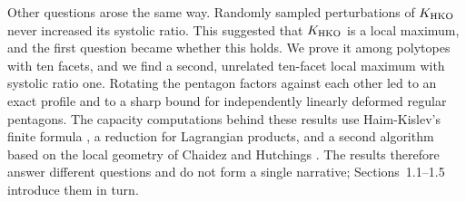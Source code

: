 Other questions arose the same way. Randomly sampled perturbations of
$K_{\rm HKO}$ never increased its systolic ratio. This suggested that
$K_{\rm HKO}$ is a local maximum, and the first question became whether this
holds. We prove it among polytopes with ten facets, and we find a second,
unrelated ten-facet local maximum with systolic ratio one. Rotating the
pentagon factors against each other led to an exact profile and to a sharp
bound for independently linearly deformed regular pentagons. The capacity
computations behind these results use Haim-Kislev's finite formula
\cite{HK2017}, a reduction for Lagrangian products, and a second algorithm
based on the local geometry of Chaidez and Hutchings \cite{CH2021}. The
results therefore answer different questions and do not form a single
narrative; Sections~1.1--1.5 introduce them in turn.

